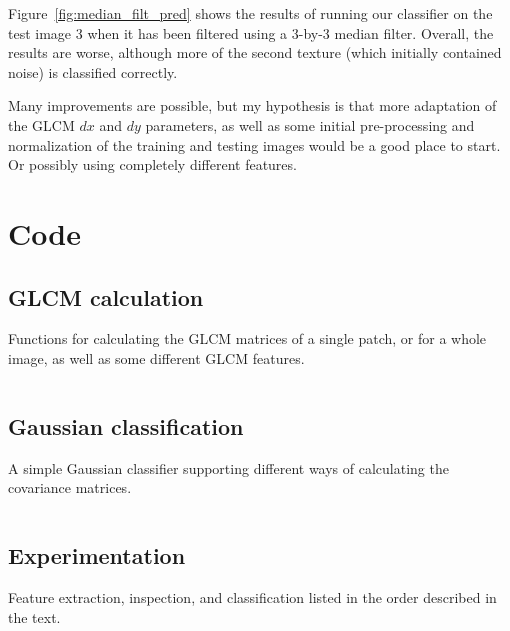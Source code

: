 \documentclass[a4paper]{article}
\begin{document}
Figure~\ref{fig:median_filt_pred} shows the results of running our
classifier on the test image 3 when it has been filtered using a 3-by-3
median filter. Overall, the results are worse, although more of the
second texture (which initially contained noise) is classified
correctly.

Many improvements are possible, but my hypothesis is that more
adaptation of the GLCM $dx$ and $dy$ parameters, as well as some initial
pre-processing and normalization of the training and testing images
would be a good place to start. Or possibly using completely different
features.

\appendix

\section{Code}
\label{app:code}

\subsection{GLCM calculation}

Functions for calculating the GLCM matrices of a single patch, or for a
whole image, as well as some different GLCM features.

\inputminted[fontsize=\footnotesize]{python}{../glcm.py}

\subsection{Gaussian classification}

A simple Gaussian classifier supporting different ways of calculating
the covariance matrices.

\inputminted[fontsize=\footnotesize]{python}{../gaussian.py}

\subsection{Experimentation}

Feature extraction, inspection, and classification listed in the order
described in the text.

\inputminted[fontsize=\footnotesize]{python}{test.py}
\end{document}
